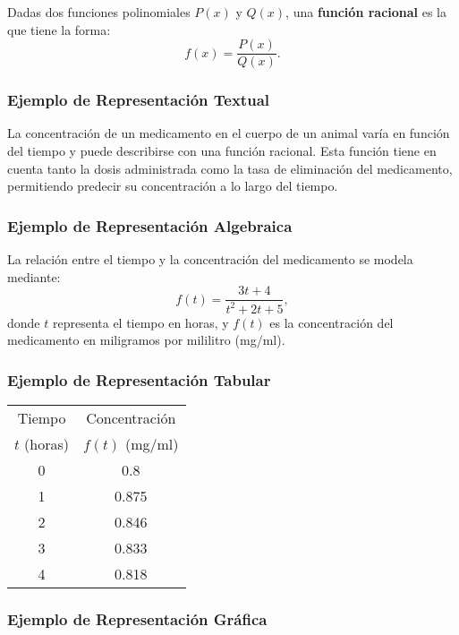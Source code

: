 \documentclass[a4,11pt]{aleph-notas}
\begin{document}
\begin{defi}  
    Dadas dos funciones polinomiales \(P(x)\) y \(Q(x)\), una \textbf{función racional} es la que tiene la forma:
    \[
        f(x)=\frac{P(x)}{Q(x)}.
    \]
\end{defi}

\subsubsection*{Ejemplo de Representación Textual}  
La concentración de un medicamento en el cuerpo de un animal varía en función del tiempo y puede describirse con una función racional. Esta función tiene en cuenta tanto la dosis administrada como la tasa de eliminación del medicamento, permitiendo predecir su concentración a lo largo del tiempo.

\subsubsection*{Ejemplo de Representación Algebraica}  
La relación entre el tiempo y la concentración del medicamento se modela mediante:  
\[
f(t) = \frac{3t + 4}{t^2 + 2t + 5},
\]
donde \(t\) representa el tiempo en horas, y \(f(t)\) es la concentración del medicamento en miligramos por mililitro (mg/ml).

\subsubsection*{Ejemplo de Representación Tabular}  
\begin{center}\small
\begin{tabular}{@{}cc@{}}
\toprule
Tiempo  & Concentración  \\
\(t\) (horas) & \(f(t)\) (mg/ml) \\
\midrule
0 & 0.8 \\
1 & 0.875 \\
2 & 0.846 \\
3 & 0.833 \\
4 & 0.818 \\
\bottomrule
\end{tabular}
\end{center}

\subsubsection*{Ejemplo de Representación Gráfica}  
\begin{center}
\end{center}
\end{document}
